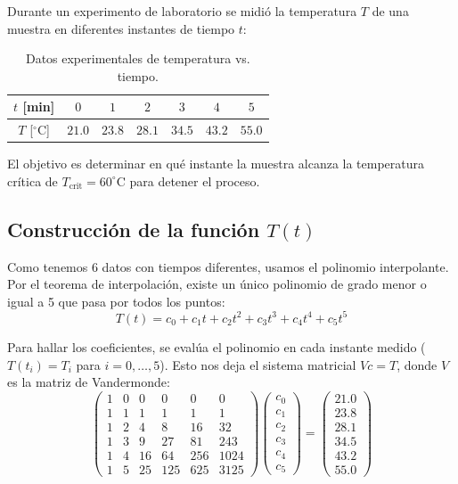 \documentclass[11pt,a4paper]{article}
\begin{document}
Durante un experimento de laboratorio se midió la temperatura $T$ de una muestra en diferentes instantes de tiempo $t$:

\begin{table}[h!]
    \centering
    \caption{Datos experimentales de temperatura vs. tiempo.}
    \begin{tabular}{ccccccc}
        \toprule
        $t$ [min] & $0$ & $1$ & $2$ & $3$ & $4$ & $5$ \\
        \midrule
        $T$ [$^\circ$C] & $21.0$ & $23.8$ & $28.1$ & $34.5$ & $43.2$ & $55.0$ \\
        \bottomrule
    \end{tabular}
\end{table}

El objetivo es determinar en qué instante la muestra alcanza la temperatura crítica de $T_{\text{crit}} = 60^\circ\text{C}$ para detener el proceso.

\subsection{Construcción de la función $T(t)$}
Como tenemos 6 datos con tiempos diferentes, usamos el polinomio interpolante. Por el teorema de interpolación, existe un único polinomio de grado menor o igual a 5 que pasa por todos los puntos:
\begin{equation}
    T(t) = c_0 + c_1 t + c_2 t^2 + c_3 t^3 + c_4 t^4 + c_5 t^5
\end{equation}

Para hallar los coeficientes, se evalúa el polinomio en cada instante medido ($T(t_i) = T_i$ para $i=0,\dots,5$). Esto nos deja el sistema matricial $V c = T$, donde $V$ es la matriz de Vandermonde:
\begin{equation}
    \begin{pmatrix}
        1 & 0 & 0 & 0 & 0 & 0 \\
        1 & 1 & 1 & 1 & 1 & 1 \\
        1 & 2 & 4 & 8 & 16 & 32 \\
        1 & 3 & 9 & 27 & 81 & 243 \\
        1 & 4 & 16 & 64 & 256 & 1024 \\
        1 & 5 & 25 & 125 & 625 & 3125
    \end{pmatrix}
    \begin{pmatrix}
        c_0 \\ c_1 \\ c_2 \\ c_3 \\ c_4 \\ c_5
    \end{pmatrix}
    =
    \begin{pmatrix}
        21.0 \\ 23.8 \\ 28.1 \\ 34.5 \\ 43.2 \\ 55.0
    \end{pmatrix}
\end{equation}
\end{document}
